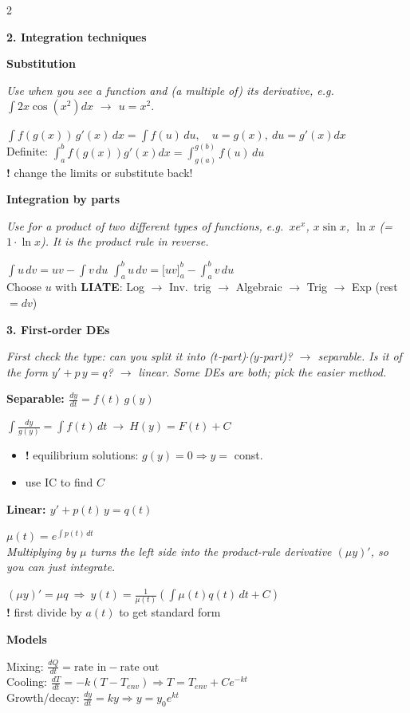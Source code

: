 \documentclass[10pt]{article}
\newcommand{\sect}[2]{%
  \par\vspace{12pt}\noindent                      %
  \colorbox{#1}{\parbox{\dimexpr\columnwidth-2\fboxsep}{\color{white}\bfseries #2}}%
  \par\vspace{4pt}}                               %
\newcommand{\sub}[1]{\par\vspace{7pt}\textbf{#1}\par\vspace{2pt}}  %
\newcommand{\expl}[1]{{\color{gray!80!black}\itshape #1}\par}
\newcommand{\warn}[1]{{\color{BrickRed}\textbf{!} #1}}
\begin{document}
\begin{multicols}{2}
\sect{cInt}{2. Integration techniques}
\sub{Substitution}
\expl{Use when you see a function \emph{and} (a multiple of) its derivative, e.g.\ $\int 2x\cos(x^2)dx$ $\rightarrow$ $u=x^2$.}
$\displaystyle\int f(g(x))\,g'(x)\,dx=\int f(u)\,du,\quad u=g(x),\ du=g'(x)dx$\\[2pt]
Definite: $\displaystyle\int_a^b f(g(x))g'(x)dx=\int_{g(a)}^{g(b)}f(u)\,du$\\
\warn{change the limits or substitute back!}

\sub{Integration by parts}
\expl{Use for a \emph{product} of two different types of functions, e.g.\ $x e^x$, $x\sin x$, $\ln x$ (= $1\cdot\ln x$). It is the product rule in reverse.}
$\displaystyle\int u\,dv=uv-\int v\,du$\qquad
$\displaystyle\int_a^b u\,dv=\big[uv\big]_a^b-\int_a^b v\,du$\\
Choose $u$ with \textbf{LIATE}: Log $\rightarrow$ Inv.\ trig $\rightarrow$ Algebraic $\rightarrow$ Trig $\rightarrow$ Exp (rest $=dv$)

\sect{cDE1}{3. First-order DEs}
\expl{First check the type: can you split it into ($t$-part)$\cdot$($y$-part)? $\rightarrow$ separable. Is it of the form $y'+p\,y=q$? $\rightarrow$ linear. Some DEs are both; pick the easier method.}
\sub{Separable: $\frac{dy}{dt}=f(t)\,g(y)$}
$\displaystyle\int\frac{dy}{g(y)}=\int f(t)\,dt\ \rightarrow\ H(y)=F(t)+C$
\begin{itemize}
  \item \warn{equilibrium solutions: $g(y)=0\Rightarrow y=$ const.}
  \item use IC to find $C$
\end{itemize}

\sub{Linear: $y'+p(t)\,y=q(t)$}
$\mu(t)=e^{\int p(t)\,dt}$\\[2pt]
\expl{Multiplying by $\mu$ turns the left side into the product-rule derivative $(\mu y)'$, so you can just integrate.}
$(\mu y)'=\mu q\ \Rightarrow\ \displaystyle y(t)=\frac{1}{\mu(t)}\left(\int\mu(t)q(t)\,dt+C\right)$\\
\warn{first divide by $a(t)$ to get standard form}

\sub{Models}
Mixing: $\frac{dQ}{dt}=\text{rate in}-\text{rate out}$\\
Cooling: $\frac{dT}{dt}=-k(T-T_{env})\Rightarrow T=T_{env}+Ce^{-kt}$\\
Growth/decay: $\frac{dy}{dt}=ky\Rightarrow y=y_0e^{kt}$


\end{multicols}
\end{document}
